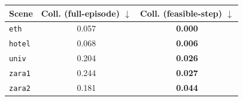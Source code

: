 \begin{tabular}{lcc}
\hline
Scene & Coll. (full-episode) $\downarrow$ & Coll. (feasible-step) $\downarrow$ \\
\hline
\texttt{eth} & 0.057 & \textbf{0.000} \\
\texttt{hotel} & 0.068 & \textbf{0.006} \\
\texttt{univ} & 0.204 & \textbf{0.026} \\
\texttt{zara1} & 0.244 & \textbf{0.027} \\
\texttt{zara2} & 0.181 & \textbf{0.044} \\
\hline
\end{tabular}
